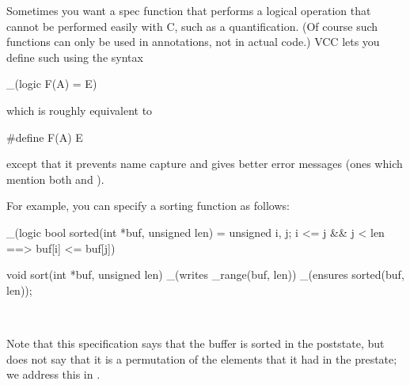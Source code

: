 Sometimes you want a spec function that performs a logical operation
that cannot be performed easily with C, such as a quantification. (Of
course such functions can only be used in annotations, not in actual
code.) VCC lets you define such  using the syntax

\begin{VCC}
_(logic F(A) = E)
\end{VCC}
which is roughly equivalent to 
\begin{VCC}
#define F(A) E
\end{VCC}
except that it prevents
name capture and gives better error messages (\ie ones which mention
both  and ). 
 
For example, you can specify a sorting function as follows:
\begin{VCC}
_(logic bool sorted(int *buf, unsigned len) =
  \forall unsigned i, j; i <= j && j < len ==> buf[i] <= buf[j])

void sort(int *buf, unsigned len)
  _(writes \array_range(buf, len))
  _(ensures sorted(buf, len));
\end{VCC}
\

\noindent Note that this specification says that the buffer is
sorted in the poststate, but does not say that it is a permutation of
the elements that it had in the prestate; we address this in
.





